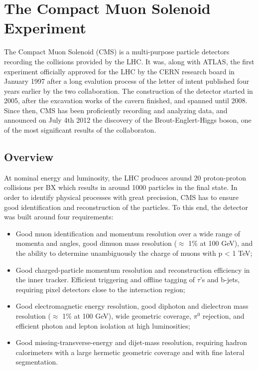 \chapter{The Compact Muon Solenoid Experiment}
\label{chap:I-3-cms}

	The Compact Muon Solenoid (CMS) \cite{1748-0221-3-08-S08004} is a multi-purpose particle detectors recording the collisions provided by the LHC. It was, along with ATLAS, the first experiment officially approved for the LHC by the CERN research board in January 1997 after a long evalution process of the letter of intent published four years earlier by the two collaboration. The construction of the detector started in 2005, after the excavation works of the cavern finished, and spanned until 2008. Since then, CMS has been proficiently recording and analyzing data, and announced on July 4th 2012 the discovery of the Brout-Englert-Higgs boson, one of the most significant results of the collaboraton.

  \section{Overview}

    At nominal energy and luminosity, the LHC produces around 20 proton-proton collisions per BX which results in around 1000 particles in the final state. In order to identify physical processes with great precission, CMS has to ensure good identification and reconstruction of the particles. To this end, the detector was built around four requirements:
    \begin{itemize}
      \item Good muon identification and momentum resolution over a wide range of momenta and angles, good dimuon mass resolution ($ \approx $ 1\% at 100 GeV), and the ability to determine unambiguously the charge of muons with p < 1 TeV;
      \item Good charged-particle momentum resolution and reconstruction efficiency in the inner tracker. Efficient triggering and offline tagging of $ \tau $'s and b-jets, requiring pixel detectors close to the interaction region;
      \item Good electromagnetic energy resolution, good diphoton and dielectron mass resolution ($ \approx $ 1\% at 100 GeV), wide geometric coverage, $ \pi^0 $ rejection, and efficient photon and lepton isolation at high luminosities;
      \item Good missing-transverse-energy and dijet-mass resolution, requiring hadron calorimeters with a large hermetic geometric coverage and with fine lateral segmentation. \\
    \end{itemize}

